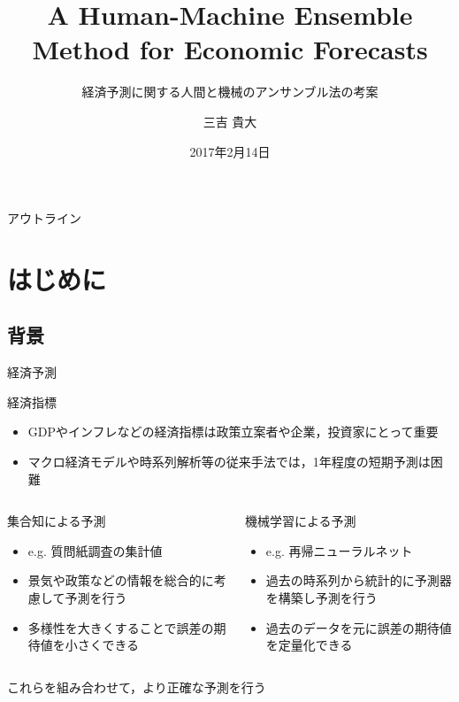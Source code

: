 \documentclass[dvipdfmx,aspectratio=169]{beamer}
\title{A Human-Machine Ensemble Method for Economic Forecasts}
\subtitle{経済予測に関する人間と機械のアンサンブル法の考案}
\author[Takahiro MIYOSHI]{三吉 貴大}
\institute[石田・松原研究室]{社会情報ネットワーク講座・広域情報ネットワーク分野}
\date{2017年2月14日}
\begin{document}
\begin{frame}[plain]
\titlepage{}
\end{frame}

\begin{frame}{アウトライン}
\tableofcontents[hideallsubsections]
\end{frame}

\section{はじめに}

\subsection{背景}

\begin{frame}{経済予測}
\begin{block}{経済指標}
  \begin{itemize}
    \item GDPやインフレなどの経済指標は政策立案者や企業，投資家にとって重要
    \item マクロ経済モデルや時系列解析等の従来手法では，1年程度の短期予測は困難
  \end{itemize}
\end{block}
\begin{columns}[onlytextwidth]
  \begin{column}{0.48\textwidth}
    \begin{block}{集合知による予測}
      \begin{itemize}
        \item e.g. 質問紙調査の集計値
        \item 景気や政策などの情報を総合的に考慮して予測を行う
        \item 多様性を大きくすることで誤差の期待値を小さくできる~\cite{Page2008}
      \end{itemize}
    \end{block}
  \end{column}
  \begin{column}{0.48\textwidth}
    \begin{block}{機械学習による予測}
      \begin{itemize}
        \item e.g. 再帰ニューラルネット
        \item 過去の時系列から統計的に予測器を構築し予測を行う
        \item 過去のデータを元に誤差の期待値を定量化できる
      \end{itemize}
    \end{block}
  \end{column}
\end{columns}
\centering
\begin{alertblock}{}
  \centering
  \alert{これらを組み合わせて，より正確な予測を行う}
\end{alertblock}
\end{frame}
\end{document}
